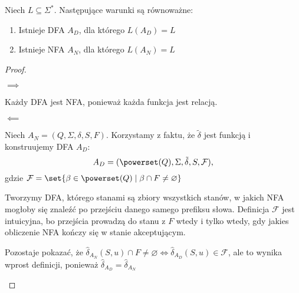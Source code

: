 \begin{theorem}
    Niech \( L \subseteq \Sigma^* \).
    Następujące warunki są równoważne:
    \begin{enumerate}
        \item Istnieje DFA \( A_D \), dla którego \( L(A_D) = L \)
        \item Istnieje NFA \( A_N \), dla którego \( L(A_N) = L \) 
    \end{enumerate}
\end{theorem}
\begin{proof} 
    \begin{description}
        \item \( \implies \)
        
        Każdy DFA jest NFA, ponieważ każda funkcja jest relacją.
            
        \item \( \impliedby \)
        
        Niech \( A_N = (Q, \Sigma, \delta, S, F) \).
        Korzystamy z faktu, że \( \tilde \delta \) jest funkcją i konstruujemy DFA \(A_D\):
        \[ A_D = (\powerset(Q), \Sigma, \tilde \delta, S, \mathcal{F}), \]
        gdzie \( \mathcal{F} = \set{\beta \in \powerset(Q) \mid \beta \cap F \neq \varnothing} \)
        
        Tworzymy DFA, którego stanami są zbiory wszystkich stanów, w jakich NFA mogłoby się znaleźć po przejściu danego samego prefiksu słowa.
        Definicja \( \mathcal{F} \) jest intuicyjna, bo przejścia prowadzą do stanu z \( F \) wtedy i tylko wtedy, gdy jakies obliczenie NFA kończy się w stanie akceptującym.  
        
        Pozostaje pokazać, że \( \hat \delta_{A_N}(S, u) \cap F \neq \varnothing \iff \hat \delta_{A_D}(S, u) \in \mathcal{F} \),
        ale to wynika wprost definicji, ponieważ \( \hat \delta_{A_D} = \hat \delta_{A_N} \)
    \end{description}
\end{proof}

